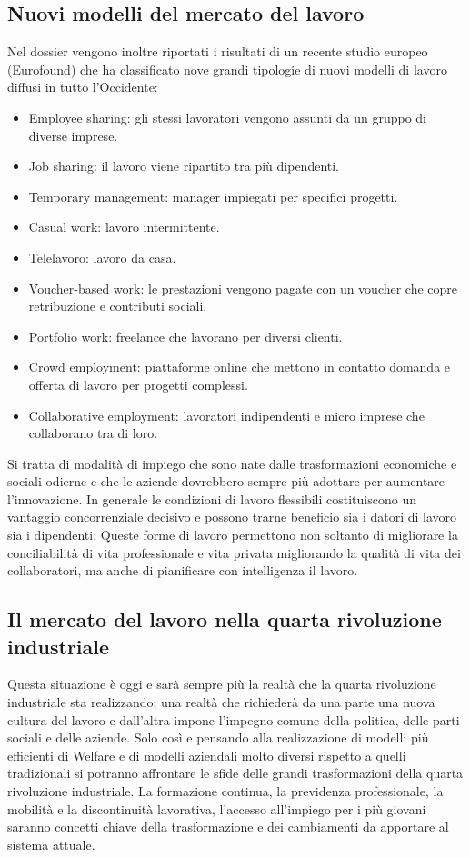 \subsection{Nuovi modelli del mercato del lavoro}
Nel dossier vengono inoltre riportati i risultati di un recente studio europeo (Eurofound) che ha classificato nove grandi tipologie di nuovi modelli di lavoro diffusi in tutto l’Occidente:
\begin{itemize}
    \item Employee sharing: gli stessi lavoratori vengono assunti da un gruppo di diverse imprese.
    \item Job sharing: il lavoro viene ripartito tra più dipendenti.
    \item Temporary management: manager impiegati per specifici progetti.
    \item Casual work: lavoro intermittente.
    \item Telelavoro: lavoro da casa.
    \item Voucher-based work: le prestazioni vengono pagate con un voucher che copre retribuzione e contributi sociali.
    \item Portfolio work: freelance che lavorano per diversi clienti.
    \item Crowd employment: piattaforme online che mettono in contatto domanda e offerta di lavoro per progetti complessi.
    \item Collaborative employment: lavoratori indipendenti e micro imprese che collaborano tra di loro.
\end{itemize}
Si tratta di modalità di impiego che sono nate dalle trasformazioni economiche e sociali odierne e che le aziende dovrebbero sempre più adottare per aumentare l’innovazione. In generale le condizioni di lavoro flessibili costituiscono un vantaggio concorrenziale decisivo e possono trarne beneficio sia i datori di lavoro sia i dipendenti. Queste forme di lavoro permettono non soltanto di migliorare la conciliabilità di vita professionale e vita privata migliorando la qualità di vita dei collaboratori, ma anche di pianificare con intelligenza il lavoro.

\subsection{Il mercato del lavoro nella quarta rivoluzione industriale}
Questa situazione è oggi e sarà sempre più la realtà che la quarta rivoluzione industriale sta realizzando; una realtà che richiederà da una parte una nuova cultura del lavoro e dall’altra impone l’impegno comune della politica, delle parti sociali e delle aziende. Solo così e pensando alla realizzazione di modelli più efficienti di Welfare e di modelli aziendali molto diversi rispetto a quelli tradizionali si potranno affrontare le sfide delle grandi trasformazioni della quarta rivoluzione industriale. La formazione continua, la previdenza professionale, la mobilità e la discontinuità lavorativa, l’accesso all’impiego per i più giovani saranno concetti chiave della trasformazione e dei cambiamenti da apportare al sistema attuale.
